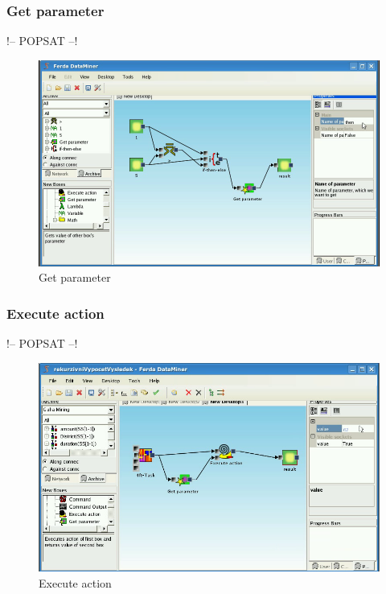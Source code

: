 \documentclass[a4paper,12pt]{book}
\begin{document}
\subsubsection{Get parameter}
!-- POPSAT --!
\begin{figure}
\includegraphics[width=1\textwidth]{getParameter2.png}
	\caption{Get parameter}
\end{figure}

\subsubsection{Execute action}
!-- POPSAT --!
\begin{figure}
\includegraphics[width=1\textwidth]{executeAction2.png}
	\caption{Execute action}
\end{figure}
\end{document}
